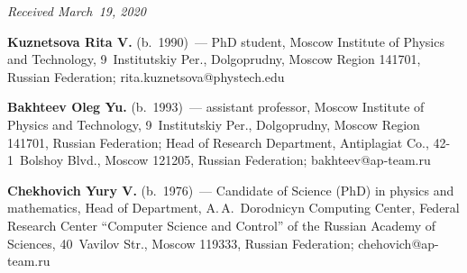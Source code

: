 \vspace*{-3pt}

  \hfill{\small\textit{Received March~19, 2020}}




\Contr

\noindent
\textbf{Kuznetsova Rita V.} (b.\ 1990)~--- 
PhD student, Moscow Institute of Physics and Technology, 
9~Institutskiy Per., Dolgoprudny, Moscow Region 141701, Russian Federation; 
\mbox{rita.kuznetsova@phystech.edu}

\vspace*{3pt}

\noindent
\textbf{Bakhteev Oleg Yu.} (b.\ 1993)~--- assistant professor, Moscow Institute of Physics and Technology, 
9~Institutskiy Per., Dolgoprudny, Moscow Region 141701, Russian Federation; Head of Research Department, 
Antiplagiat Co., 42-1~Bolshoy Blvd., Moscow 121205, Russian Federation;
\mbox{bakhteev@ap-team.ru}

\vspace*{3pt}

\noindent
\textbf{Chekhovich Yury V.} (b.\ 1976)~--- 
Candidate of Science (PhD) in physics and mathematics, 
Head of Department, A.\,A.~Dorodnicyn Computing Center, 
Federal Research Center ``Computer Science and Control'' of the Russian Academy of Sciences, 
40~Vavilov Str., Moscow 119333, Russian Federation; \mbox{chehovich@ap-team.ru}

\label{end\stat}

\renewcommand{\bibname}{\protect\rm Литература}